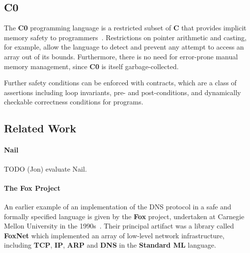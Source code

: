 \documentclass{article}
\newcommand\Kwd[1]{{\sffamily\bfseries{#1}}}
\begin{document}
\subsection{C0}\label{sec:c0}

The \Kwd{C0} programming language is a restricted subset of \Kwd{C}
that provides implicit memory safety to
programmers~\cite{pfenning:c0-reference}. Restrictions on pointer
arithmetic and casting, for example, allow the language to detect and
prevent any attempt to access an array out of its bounds. Furthermore,
there is no need for error-prone manual memory management, since
\Kwd{C0} is itself garbage-collected.

Further safety conditions can be enforced with contracts, which are a
class of assertions including loop invariants, pre- and
post-conditions, and dynamically checkable correctness conditions for
programs.





\subsection{Related Work}

\paragraph{Nail} TODO (Jon) evaluate Nail.
\nocite{bangert:2014}


\paragraph{The \Kwd{Fox} Project}
An earlier example of an implementation of the DNS protocol in a safe
and formally specified language is given by the \Kwd{Fox} project,
undertaken at Carnegie Mellon University in the
1990s~\cite{biagioni-harper-lee-milnes:1994,
  biagioni-harper-lee:2001}. Their principal artifact was a library
called \Kwd{FoxNet} which implemented an array of low-level network
infrastructure, including \Kwd{TCP}, \Kwd{IP}, \Kwd{ARP} and \Kwd{DNS}
in the \Kwd{Standard ML} language.
\end{document}
